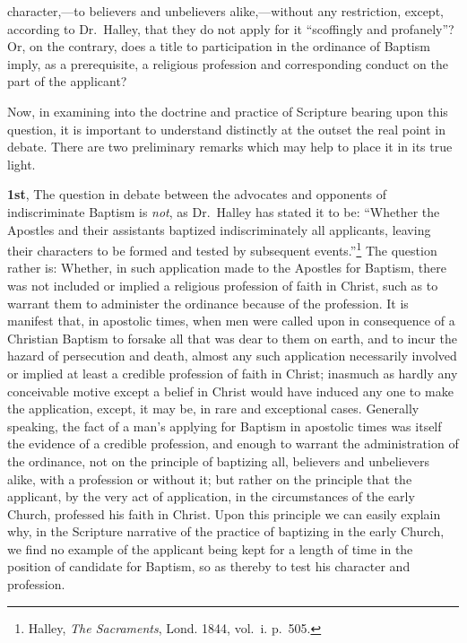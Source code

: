 \documentclass[
]{book}
\begin{document}
character,---to believers and unbelievers alike,---without any restriction, except, according to Dr.~Halley, that they do not apply for it ``scoffingly and profanely''? Or, on the contrary, does a title to participation in the ordinance of Baptism imply, as a prerequisite, a religious profession and corresponding conduct on the part of the applicant?

Now, in examining into the doctrine and practice of Scripture bearing upon this question, it is important to understand distinctly at the outset the real point in debate. There are two preliminary remarks which may help to place it in its true light.

\textbf{1st}, The question in debate between the advocates and opponents of indiscriminate Baptism is \emph{not}, as Dr.~Halley has stated it to be: ``Whether the Apostles and their assistants baptized indiscriminately all applicants, leaving their characters to be formed and tested by subsequent events.''\footnote{Halley, \emph{The Sacraments}, Lond. 1844, vol.~i. p.~505.} The question rather is: Whether, in such application made to the Apostles for Baptism, there was not included or implied a religious profession of faith in Christ, such as to warrant them to administer the ordinance because of the profession. It is manifest that, in apostolic times, when men were called upon in consequence of a Christian Baptism to forsake all that was dear to them on earth, and to incur the hazard of persecution and death, almost any such application necessarily involved or implied at least a credible profession of faith in Christ; inasmuch as hardly any conceivable motive except a belief in Christ would have induced any one to make the application, except, it may be, in rare and exceptional cases. Generally speaking, the fact of a man's applying for Baptism in apostolic times was itself the evidence of a credible profession, and enough to warrant the administration of the ordinance, not on the principle of baptizing all, believers and unbelievers alike, with a profession or without it; but rather on the principle that the applicant, by the very act of application, in the circumstances of the early Church, professed his faith in Christ. Upon this principle we can easily explain why, in the Scripture narrative of the practice of baptizing in the early Church, we find no example of the applicant being kept for a length of time in the position of candidate for Baptism, so as thereby to test his character and profession.
\end{document}
